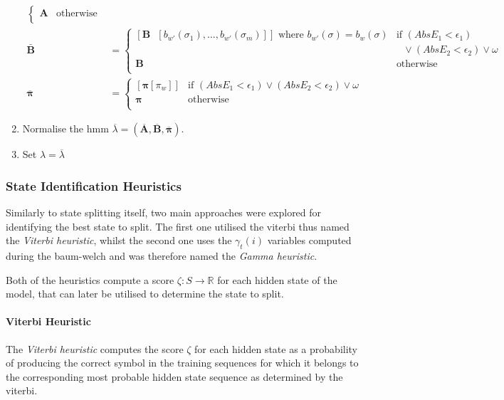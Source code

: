 \begin{enumerate}
\begin{align*}
\begin{cases}
\mathbf{A} &\text{otherwise} \\
\end{cases}\\
\mathbf{\bar{B}} &= \begin{cases}
[\mathbf{B} \text{ } [b_{w'}(\sigma_1),  ... , b_{w'}(\sigma_m)]]
\text{ where } b_{w'}(\sigma) = b_{w}(\sigma)
&\text{if } (AbsE_1 < \epsilon_1) \\
&\text{ }\vee (AbsE_2 < \epsilon_2) \vee \omega\\
\mathbf{B} &\text{otherwise} \\
\end{cases}\\
\overline{\boldsymbol{\pi}} &=\begin{cases}
[\boldsymbol{\pi}[\pi_w]]&\text{if } (AbsE_1 < \epsilon_1) \vee (AbsE_2 < \epsilon_2) \vee \omega\\
\boldsymbol{\pi} &\text{otherwise} \\
\end{cases}
\end{align*}
\item Normalise the \gls{hmm} $\overline{\lambda} = (\mathbf{\overline{A}}, \mathbf{\overline{B}}, \overline{\boldsymbol{\pi}})$.
\item Set $\lambda = \overline{\lambda}$
\end{enumerate}

\subsubsection{State Identification Heuristics}
Similarly to state splitting itself, two main approaches were explored for identifying the best state to split. The first one utilised the \gls{viterbi} thus named the \emph{Viterbi heuristic}, whilst the second one uses the $\gamma_t(i)$ variables computed during the \gls{baum-welch} and was therefore named the \emph{Gamma heuristic}.

Both of the heuristics compute a score $\zeta:S \rightarrow \mathbb{R}$ for each hidden state of the model, that can later be utilised to determine the state to split.

\paragraph{Viterbi Heuristic}
The \emph{Viterbi heuristic} computes the score $\zeta$ for each hidden state as a probability of producing the correct symbol in the training sequences for which it belongs to the corresponding most probable hidden state sequence as determined by the \gls{viterbi}.

